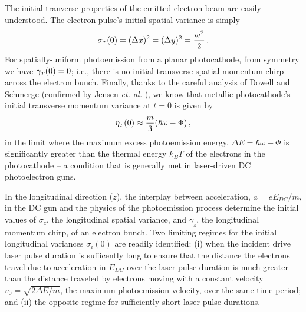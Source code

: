 The initial tranverse properties of the emitted electron beam are easily understood.
The electron pulse's initial spatial variance is simply
\begin{equation}
\sigma_{{\scriptscriptstyle T} } ( 0 ) = ( \Delta x )^{2} = ( \Delta y)^{2} = \frac{ w^{2} }{ 2 } \, \text{.}
\end{equation}
For spatially-uniform photoemission from a planar photocathode, from symmetry we have $ \gamma_{{\scriptscriptstyle T}} ( 0 ) = 0 $; i.e., there is no initial transverse spatial momentum chirp across the electron bunch.
Finally, thanks to the careful analysis of Dowell and Schmerge \cite{dowell_quantum_2009} (confirmed by Jensen \textit{et. al.} \cite{jensen_emittance_2010}), we know that metallic photocathode's initial transverse momentum variance at $ t = 0 $ is given by
\begin{equation} \label{eq:jensen_eta}
  \eta_{ {\scriptscriptstyle T} } ( 0 ) \approx \frac{ m }{ 3 } ( \hbar \omega - \Phi ) \, \text{,}
\end{equation}
in the limit where the maximum excess photoemission energy, $ \Delta E = \hbar \omega - \Phi $ is significantly greater than the thermal energy $ k_{B} T $ of the electrons in the photocathode -- a condition that is generally met in laser-driven DC photoelectron guns.

In the longitudinal direction ($z$), the interplay between acceleration, $ a = e E_{DC}/m $, in the DC gun and the physics of the photoemission process determine the initial values of $\sigma_z$, the longitudinal spatial variance, and $\gamma_z$, the longitudinal momentum chirp, of an electron bunch.
Two limiting regimes for the initial longitudinal variances $ \sigma_{i} ( 0 ) $ are readily identified: (i) when the incident drive laser pulse duration is sufficently long to ensure that the distance the electrons travel due to acceleration in $ E_{DC} $ over the laser pulse duration is much greater than the distance traveled by electrons moving with a constant velocity $ v_{0} = \sqrt{ 2 \Delta E / m } $, the maximum photoemission velocity, over the same time period; and (ii) the opposite regime for sufficiently short laser pulse durations.


